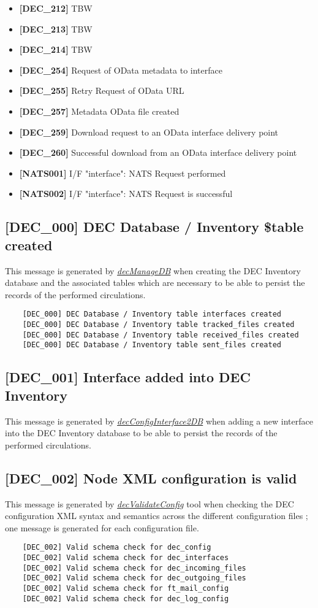 \documentclass[dec_sum_main.tex]{subfiles}
\begin{document}
\begin{itemize}
	\item \textbf{[DEC\_212]} TBW
	\item \textbf{[DEC\_213]} TBW
	\item \textbf{[DEC\_214]} TBW
    \item \textbf{[DEC\_254]} Request of OData metadata to interface
    \item \textbf{[DEC\_255]} Retry Request of OData URL		
    \item \textbf{[DEC\_257]} Metadata OData file created	
    \item \textbf{[DEC\_259]} Download request to an OData interface delivery point
    \item \textbf{[DEC\_260]} Successful download from an OData interface delivery point
    \item \textbf{[NATS001]} I/F "interface": NATS Request performed
	\item \textbf{[NATS002]} I/F "interface": NATS Request is successful	
\end{itemize}

\label{DEC000}
\subsection{[DEC\_000] DEC Database / Inventory \$table created}
This message is generated by \hyperref[decManageDB]{\textit{decManageDB}} when creating the DEC Inventory database and the associated tables which are necessary to be able to persist the records of the performed circulations.
\begin{verbatim}
	[DEC_000] DEC Database / Inventory table interfaces created
	[DEC_000] DEC Database / Inventory table tracked_files created
	[DEC_000] DEC Database / Inventory table received_files created
	[DEC_000] DEC Database / Inventory table sent_files created
\end{verbatim}

\label{DEC001}
\subsection{[DEC\_001] Interface added into DEC Inventory}
This message is generated by \hyperref[decConfigInterface2DB]{\textit{decConfigInterface2DB}} when adding a new interface into the DEC Inventory database to be able to persist the records of the performed circulations.

\label{DEC002}
\subsection{[DEC\_002] Node XML configuration is valid}
This message is generated by \hyperref[decValidateConfig]{\textit{decValidateConfig}} tool when checking the DEC configuration XML syntax and semantics across the different configuration files ; one message is generated for each configuration file.
\begin{verbatim}
	[DEC_002] Valid schema check for dec_config
	[DEC_002] Valid schema check for dec_interfaces
	[DEC_002] Valid schema check for dec_incoming_files
	[DEC_002] Valid schema check for dec_outgoing_files
	[DEC_002] Valid schema check for ft_mail_config
	[DEC_002] Valid schema check for dec_log_config
\end{verbatim}
\end{document}
